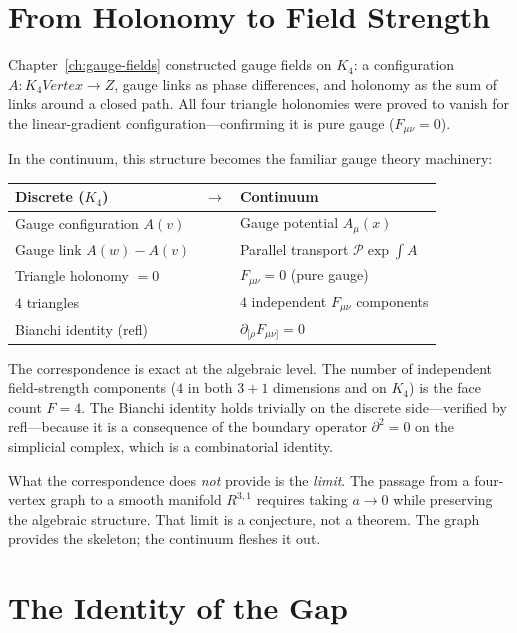 \documentclass[11pt,a4paper]{book}
\def\mathbb#1{#1}%
\def\texttt#1{#1}%
\def\text#1{#1}%
\begin{document}
\section{From Holonomy to Field Strength}
\label{sec:holonomy-to-field-strength}

Chapter~\ref{ch:gauge-fields} constructed gauge fields on $K_4$: a configuration $A : K_4\text{Vertex} \to \mathbb{Z}$, gauge links as phase differences, and holonomy as the sum of links around a closed path. All four triangle holonomies were proved to vanish for the linear-gradient configuration---confirming it is pure gauge ($F_{\mu\nu} = 0$).

In the continuum, this structure becomes the familiar gauge theory machinery:

\begin{center}
\begin{tabular}{lcl}
\toprule
Discrete ($K_4$) & $\longrightarrow$ & Continuum \\
\midrule
Gauge configuration $A(v)$ & & Gauge potential $A_\mu(x)$ \\
Gauge link $A(w) - A(v)$ & & Parallel transport $\mathcal{P}\exp\!\int A$ \\
Triangle holonomy $= 0$ & & $F_{\mu\nu} = 0$ (pure gauge) \\
$4$ triangles & & $4$ independent $F_{\mu\nu}$ components \\
Bianchi identity (\texttt{refl}) & & $\partial_{[\rho} F_{\mu\nu]} = 0$ \\
\bottomrule
\end{tabular}
\end{center}

The correspondence is exact at the algebraic level. The number of independent field-strength components ($4$ in both $3+1$ dimensions and on $K_4$) is the face count $F = 4$. The Bianchi identity holds trivially on the discrete side---verified by \texttt{refl}---because it is a consequence of the boundary operator $\partial^2 = 0$ on the simplicial complex, which is a combinatorial identity.

What the correspondence does \emph{not} provide is the \emph{limit}. The passage from a four-vertex graph to a smooth manifold $\mathbb{R}^{3,1}$ requires taking $a \to 0$ while preserving the algebraic structure. That limit is a conjecture, not a theorem. The graph provides the skeleton; the continuum fleshes it out.

\section{The Identity of the Gap}
\label{sec:identity-of-the-gap}
\end{document}
